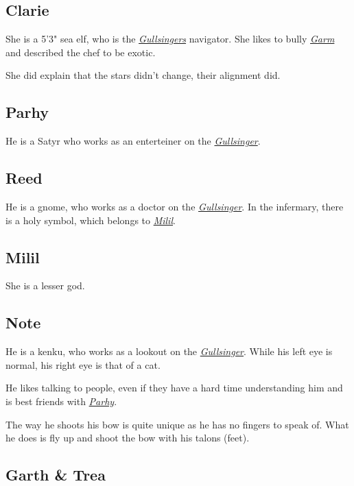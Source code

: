 \documentclass{article}
\begin{document}
\begin{multicols}{2}
    \subsection{Clarie}
    \label{clarie}

    She is a 5'3" sea elf, who is the \hyperref[gullsinger]{\textit{Gullsingers}} navigator. She likes to bully \hyperref[garm]{\textit{Garm}} and described the chef to be exotic.

    She did explain that the stars didn't change, their alignment did.

    \subsection{Parhy}
    \label{parhy}

    He is a Satyr who works as an enterteiner on the \hyperref[gullsinger]{\textit{Gullsinger}}.

    \subsection{Reed}
    \label{reed}

    He is a gnome, who works as a doctor on the \hyperref[gullsinger]{\textit{Gullsinger}}. In the infermary, there is a holy symbol, which belongs to \hyperref[milil]{\textit{Milil}}.

    \subsection{Milil}
    \label{milil}

    She is a lesser god.

    \subsection{Note}
    \label{note}

    He is a kenku, who works as a lookout on the \hyperref[gullsinger]{\textit{Gullsinger}}. While his left eye is normal, his right eye is that of a cat.

    He likes talking to people, even if they have a hard time understanding him and is best friends with \hyperref[parhy]{\textit{Parhy}}.

    The way he shoots his bow is quite unique as he has no fingers to speak of. What he does is fly up and shoot the bow with his talons (feet).

    \subsection{Garth \& Trea}
    \label{garth_trea}


\end{multicols}
\end{document}
